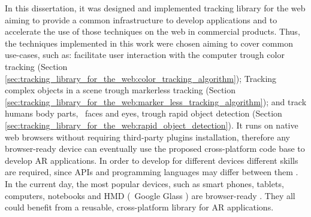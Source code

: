 In this dissertation, it was designed and implemented tracking library for the web aiming to provide a common infrastructure to develop applications and to accelerate the use of those techniques on the web in commercial products. Thus, the techniques implemented in this work were chosen aiming to cover common use-cases, such as: facilitate user interaction with the computer trough color tracking (Section \ref{sec:tracking_library_for_the_web:color_tracking_algorithm}); Tracking complex objects in a scene trough markerless tracking (Section \ref{sec:tracking_library_for_the_web:marker_less_tracking_algorithm}); and track humans body parts, \eg\ faces and eyes, trough rapid object detection (Section \ref{sec:tracking_library_for_the_web:rapid_object_detection}).
It runs on native web browsers without requiring third-party plugins installation, therefore any browser-ready device can eventually use the proposed cross-platform code base to develop AR applications. In order to develop for different devices different skills are required, since APIs and programming languages may differ between them \cite{MDN2013,International2009}. In the current day, the most popular devices, such as smart phones, tablets, computers, notebooks and HMD (\ie\ Google Glass \cite{Glass2013}) \cite{Benford1998} are browser-ready \cite{Hickson2013}. They all could benefit from a reusable, cross-platform library for AR applications.



